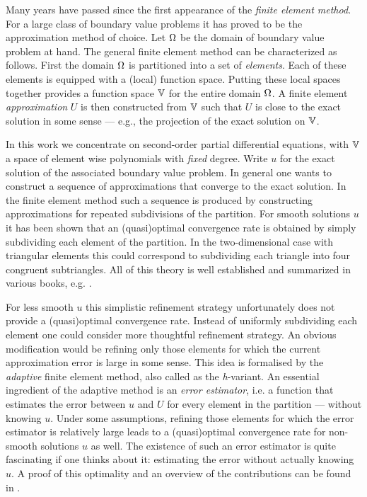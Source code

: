 \documentclass[thesis.tex]{subfiles}
\begin{document}
Many years have passed since the first appearance of the \emph{finite element method}. 
For a large class of boundary value problems it has proved to be the approximation method of choice. 
Let $\Omega$ be the domain of boundary value problem at hand. The general finite element method can be characterized as follows.
First the domain $\Omega$ is partitioned into a set of \emph{elements}.  Each of these elements is equipped with a (local) function space.
Putting these local spaces together provides a function space $\mathbb{V}$ for the entire domain $\Omega$. A finite element \emph{approximation} $U$
is then constructed from $\mathbb{V}$ such that $U$ is close to the exact solution in some sense 
--- e.g., the projection of the exact solution on $\mathbb{V}$. 

In this work we concentrate on second-order partial differential equations, with $\mathbb{V}$
a space of element wise polynomials with \emph{fixed} degree. Write $u$ for the exact solution
of the associated boundary value problem. In general one wants to construct a sequence of approximations that converge to
the exact solution. In the finite element method such a sequence is produced by constructing
approximations for repeated subdivisions of the partition. For smooth solutions $u$ it has been shown
that an (quasi)optimal convergence rate is obtained by simply subdividing each element of the partition. 
In the two-dimensional case with triangular elements this could correspond to subdividing each triangle into four
congruent subtriangles. All of this theory is well established and summarized  in various books, e.g. \cite{brenner, zienkiewicz1977finite}.

For less smooth $u$ this simplistic refinement strategy unfortunately does not provide a (quasi)optimal convergence rate.
Instead of uniformly subdividing each element one could consider more thoughtful refinement strategy.
An obvious modification would be refining only those elements for which the current approximation error is large in some sense.
This idea is formalised by the \emph{adaptive} finite element method, also called as the \emph{h}-variant.
An essential ingredient of the adaptive method is an \emph{error estimator}, i.e. a function that estimates
the error between $u$ and $U$ for every element in the partition --- without knowing $u$. Under some assumptions, refining those
elements for which the error estimator is relatively large leads to a (quasi)optimal convergence rate for non-smooth
solutions $u$ as well. The existence of such an error estimator is quite fascinating  if one thinks about it: estimating
the error without actually knowing $u$.  A proof of this optimality and an overview of the contributions can be found in \cite{cascon2008}.
\end{document}
